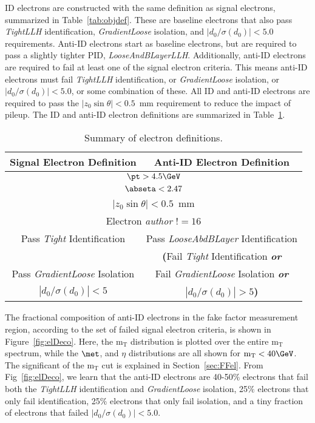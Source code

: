 ID electrons are constructed with the same definition as signal electrons, summarized in Table~\ref{tab:objdef}.  These are baseline electrons that also pass \textit{TightLLH} identification, \textit{GradientLoose} isolation, and $|d_0/\sigma(d_0)|<5.0$ requirements.  Anti-ID electrons start as baseline electrons, but are required to pass a slightly tighter PID, \textit{LooseAndBLayerLLH}.  Additionally, anti-ID electrons are required to fail at least one of the signal electron criteria.  This means anti-ID electrons must fail \textit{TightLLH} identification, or \textit{GradientLoose} isolation, or $|d_0/\sigma(d_0)|<5.0$, or some combination of these. %
All ID and anti-ID electrons are required to pass the $|z_0\sin\theta| < 0.5$~mm requirement to reduce the impact of pileup.  The ID and anti-ID electron definitions are summarized in Table~\ref{tab:AllElDefs}. 
\begin{table}[!htb]
\begin{center}
\begin{tabular}{c|c}
\hline
Signal Electron Definition  & Anti-ID Electron Definition \\
\hline \hline
\multicolumn{2}{c}{$\pt > 4.5\GeV$}      \\
\multicolumn{2}{c}{$\abseta < 2.47$ }     \\
\multicolumn{2}{c}{$|z_0\sin\theta| < 0.5$~mm} \\
\multicolumn{2}{c}{Electron \textit{author} $!= 16$}\\
Pass \textit{Tight} Identification & Pass \textit{LooseAbdBLayer} Identification\\
      &             \textbf{(}Fail \textit{Tight} Identification \textbf{\textit{or}} \\
Pass \textit{GradientLoose} Isolation  & Fail \textit{GradientLoose} Isolation \textbf{\textit{or}} \\   
$|d_0/\sigma(d_0)| < 5$  &   $|d_0/\sigma(d_0)| > 5$\textbf{)} \\
\hline
\end{tabular}
\caption{Summary of electron definitions.}
\label{tab:AllElDefs}
\end{center}
\end{table}
The fractional composition of anti-ID electrons in the fake factor measurement region, according to the set of failed signal electron criteria, is shown in Figure~\ref{fig:elDeco}. Here, the $\mathrm{m_T}$ distribution is plotted over the entire $\mathrm{m_T}$ spectrum, while the $\met$, \pt{} and $\eta$ distributions are all shown for $\mathrm{m_T} <40\GeV$.  The significant of the $\mathrm{m_T}$ cut is explained in Section~\ref{sec:FFel}.  From Fig~\ref{fig:elDeco}, we learn that the anti-ID electrons are 40-50$\%$ electrons that fail both the \textit{TightLLH} identification and \textit{GradientLoose} isolation, 25$\%$ electrons that only fail identification, 25$\%$ electrons that only fail isolation, and a tiny fraction of electrons that failed $|d_0/\sigma(d_0)|<5.0$. 
